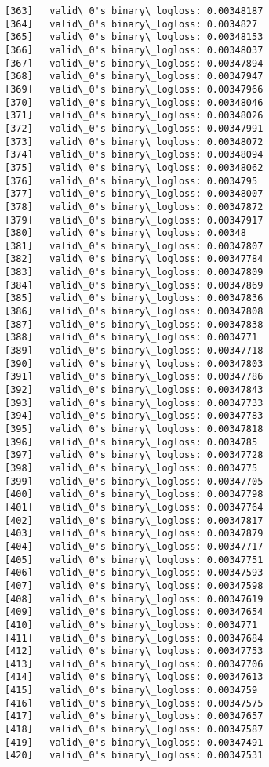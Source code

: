 \documentclass[11pt]{article}
\begin{document}
\begin{Verbatim}[commandchars=\\\{\}]
[363]	valid\_0's binary\_logloss: 0.00348187
[364]	valid\_0's binary\_logloss: 0.0034827
[365]	valid\_0's binary\_logloss: 0.00348153
[366]	valid\_0's binary\_logloss: 0.00348037
[367]	valid\_0's binary\_logloss: 0.00347894
[368]	valid\_0's binary\_logloss: 0.00347947
[369]	valid\_0's binary\_logloss: 0.00347966
[370]	valid\_0's binary\_logloss: 0.00348046
[371]	valid\_0's binary\_logloss: 0.00348026
[372]	valid\_0's binary\_logloss: 0.00347991
[373]	valid\_0's binary\_logloss: 0.00348072
[374]	valid\_0's binary\_logloss: 0.00348094
[375]	valid\_0's binary\_logloss: 0.00348062
[376]	valid\_0's binary\_logloss: 0.0034795
[377]	valid\_0's binary\_logloss: 0.00348007
[378]	valid\_0's binary\_logloss: 0.00347872
[379]	valid\_0's binary\_logloss: 0.00347917
[380]	valid\_0's binary\_logloss: 0.00348
[381]	valid\_0's binary\_logloss: 0.00347807
[382]	valid\_0's binary\_logloss: 0.00347784
[383]	valid\_0's binary\_logloss: 0.00347809
[384]	valid\_0's binary\_logloss: 0.00347869
[385]	valid\_0's binary\_logloss: 0.00347836
[386]	valid\_0's binary\_logloss: 0.00347808
[387]	valid\_0's binary\_logloss: 0.00347838
[388]	valid\_0's binary\_logloss: 0.0034771
[389]	valid\_0's binary\_logloss: 0.00347718
[390]	valid\_0's binary\_logloss: 0.00347803
[391]	valid\_0's binary\_logloss: 0.00347786
[392]	valid\_0's binary\_logloss: 0.00347843
[393]	valid\_0's binary\_logloss: 0.00347733
[394]	valid\_0's binary\_logloss: 0.00347783
[395]	valid\_0's binary\_logloss: 0.00347818
[396]	valid\_0's binary\_logloss: 0.0034785
[397]	valid\_0's binary\_logloss: 0.00347728
[398]	valid\_0's binary\_logloss: 0.0034775
[399]	valid\_0's binary\_logloss: 0.00347705
[400]	valid\_0's binary\_logloss: 0.00347798
[401]	valid\_0's binary\_logloss: 0.00347764
[402]	valid\_0's binary\_logloss: 0.00347817
[403]	valid\_0's binary\_logloss: 0.00347879
[404]	valid\_0's binary\_logloss: 0.00347717
[405]	valid\_0's binary\_logloss: 0.00347751
[406]	valid\_0's binary\_logloss: 0.00347593
[407]	valid\_0's binary\_logloss: 0.00347598
[408]	valid\_0's binary\_logloss: 0.00347619
[409]	valid\_0's binary\_logloss: 0.00347654
[410]	valid\_0's binary\_logloss: 0.0034771
[411]	valid\_0's binary\_logloss: 0.00347684
[412]	valid\_0's binary\_logloss: 0.00347753
[413]	valid\_0's binary\_logloss: 0.00347706
[414]	valid\_0's binary\_logloss: 0.00347613
[415]	valid\_0's binary\_logloss: 0.0034759
[416]	valid\_0's binary\_logloss: 0.00347575
[417]	valid\_0's binary\_logloss: 0.00347657
[418]	valid\_0's binary\_logloss: 0.00347587
[419]	valid\_0's binary\_logloss: 0.00347491
[420]	valid\_0's binary\_logloss: 0.00347531

\end{Verbatim}
\end{document}
